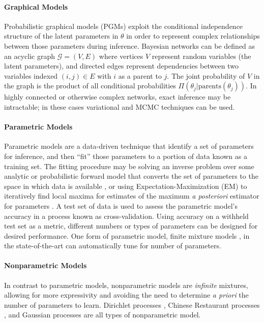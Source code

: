 \paragraph{Graphical Models}
Probabilistic graphical models (PGMs) exploit the conditional independence structure of the latent parameters in $\theta$ in order to represent complex relationships between those parameters during inference. Bayesian networks \autocite{ghahramani2001introduction,aguilera2011bayesian,Arora2017} can be defined as an acyclic graph $\mathcal{G} = (V, E)$ where vertices $V$ represent random variables (the latent parameters), and directed edges represent dependencies between two variables indexed $(i, j) \in E$ with $i$ as a parent to $j$. The joint probability of $V$ in the graph is the product of all conditional probabilities $\Pi(\theta_j | \text{parents}(\theta_j))$. In highly connected or otherwise complex networks, exact inference may be intractable; in these cases variational and MCMC techniques can be used. 

\paragraph{Parametric Models}
Parametric models are a data-driven technique that identify a set of parameters for inference, and then ``fit'' those parameters to a portion of data known as a training set. The fitting procedure may be solving an inverse problem over some analytic or probabilistic forward model that converts the set of parameters to the space in which data is available \autocite{puonti2016fast}, or using Expectation-Maximization (EM) to iteratively find local maxima for estimates of the maximum \emph{a posteriori} estimator for parameters \autocite{moon1996expectation}. A test set of data is used to assess the parametric model's accuracy in a process known as cross-validation. Using accuracy on a withheld test set as a metric, different numbers or types of parameters can be designed for desired performance. One form of parametric model, finite mixture models \autocite{figueiredo2002unsupervised}, in the state-of-the-art can automatically tune for number of parameters.

\paragraph{Nonparametric Models}
In contrast to parametric models, nonparametric models are \emph{infinite} mixtures, allowing for more expressivity and avoiding the need to determine \emph{a priori} the number of parameters to learn. Dirichlet processes \autocite{ferguson1973bayesian}, Chinese Restaurant processes \autocite{griffiths2003hierarchical}, and Gaussian processes \autocite{Rasmussen2004} are all types of nonparametric model. 

